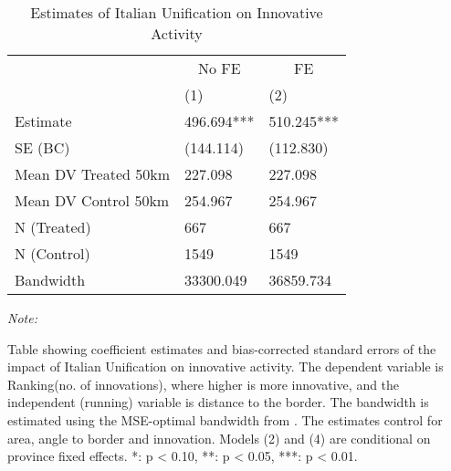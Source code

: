 \begin{table}[!h]

\caption{\label{tab:rd_analysis_rank}Estimates of Italian Unification on Innovative Activity}
\centering
\fontsize{8}{10}\selectfont
\begin{threeparttable}
\begin{tabular}[t]{lll}
\toprule
\multicolumn{1}{c}{ } & \multicolumn{1}{c}{No FE} & \multicolumn{1}{c}{FE} \\
\cmidrule(l{3pt}r{3pt}){2-2} \cmidrule(l{3pt}r{3pt}){3-3}
  & (1) & (2)\\
\midrule
Estimate & 496.694*** & 510.245***\\
SE (BC) & (144.114) & (112.830)\\
Mean DV Treated 50km & 227.098 & 227.098\\
Mean DV Control 50km & 254.967 & 254.967\\
N (Treated) & 667 & 667\\
N (Control) & 1549 & 1549\\
Bandwidth & 33300.049 & 36859.734\\
\bottomrule
\end{tabular}
\begin{tablenotes}[para]
\item \textit{Note: } 
\item Table showing coefficient estimates and bias-corrected standard errors of the impact of Italian Unification on innovative activity. The dependent variable is Ranking(no. of innovations), where higher is more innovative, and the independent (running) variable is distance to the border. The bandwidth is estimated using the MSE-optimal bandwidth from \cite{cattaneo2019practical}. The estimates control for area, angle to border and innovation. Models (2) and (4) are conditional on province fixed effects. *: p < 0.10, **: p < 0.05, ***: p < 0.01.
\end{tablenotes}
\end{threeparttable}
\end{table}
